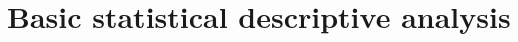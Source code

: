

\section{Basic statistical descriptive analysis}%
\label{sec:basic_statistical_descriptive_analysis}




